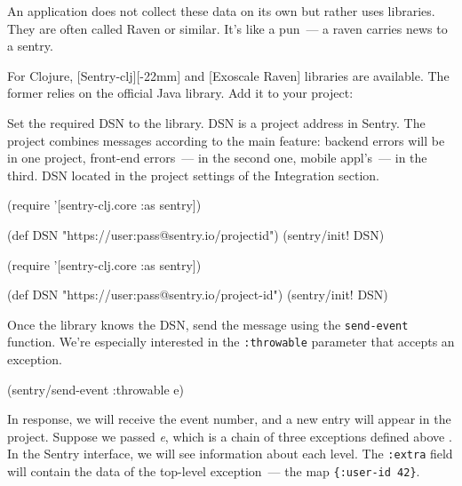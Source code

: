 
An application does not collect these data on its own but rather uses libraries. They are often called Raven or similar. It's like a pun~--- a raven carries news to a sentry.

For Clojure, [Sentry-clj][-22mm] and [Exoscale Raven] libraries are available. The former relies on the official Java library. Add it to your project:

\begin{clojure}
\end{clojure}


Set the required DSN to the library. DSN is a project address in Sentry. The project combines messages according to the main feature: backend errors will be in one project, front-end errors~--- in the second one, mobile appl's~--- in the third. DSN located in the project settings of the Integration section.

\ifnarrow

\begin{clojure}
(require '[sentry-clj.core :as sentry])

(def DSN
 "https://user:pass@sentry.io/projectid")
(sentry/init! DSN)
\end{clojure}

\else

\begin{clojure}
(require '[sentry-clj.core :as sentry])

(def DSN "https://user:pass@sentry.io/project-id")
(sentry/init! DSN)
\end{clojure}

\fi

Once the library knows the DSN, send the message using the \verb|send-event| function. We're especially interested in the \verb|:throwable| parameter that accepts an exception.

\begin{clojure}
(sentry/send-event {:throwable e})
\end{clojure}

In response, we will receive the event number, and a new entry will appear in the project. Suppose we passed \emph{e}, which is a chain of three exceptions defined above . In the Sentry interface, we will see information about each level. The \verb|:extra| field will contain the data of the top-level exception~--- the map \verb|{:user-id 42}|.

